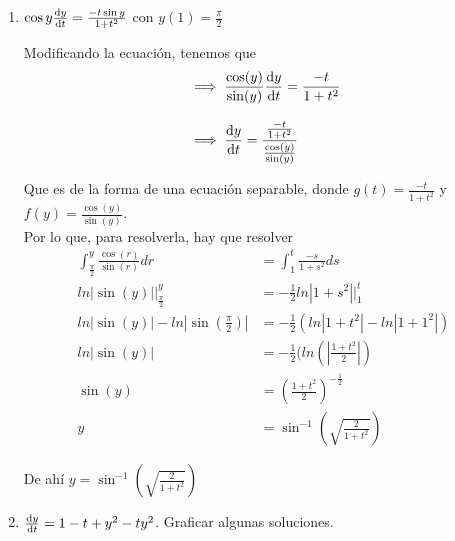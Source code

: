 \documentclass[14pt]{extarticle}
\begin{document}
\begin{enumerate}
{\begin{enumerate}
{                }

                \item {
                    $\cos{y}\dv{y}{t}=\frac{-t\sin{y}}{1+t^2}$
                    con $y(1)=\frac{\pi}{2}$

                    \color{azul}
                    Modificando la ecuación, tenemos que
                    \begin{align*}
                    &\implies \frac{\cos(y)}{\sin(y)}\dv{y}{t} = \frac{-t}{1 + t^2}\\[.3cm]
                    &\implies \dv{y}{t} = \frac{\frac{-t}{1 + t^2}}{ \frac{\cos(y)}{\sin(y)}}
                    \end{align*}
                    
                    Que es de la forma de una ecuación separable, donde $g(t) = \frac{-t}{1 + t^2}$ y $f(y) = \frac{\cos(y)}{\sin(y)}$.\\[.3cm]
                    
                    Por lo que, para resolverla, hay que resolver\\[.3cm]
                    
                    \begin{align*}
                    \int_{\frac{\pi}{2}}^{y} \frac{\cos(r)}{\sin(r)} dr &= \int_{1}^{t} \frac{-s}{1 + s^2} ds\\[.3cm]
                    ln|\sin(y)|\Big|_{\frac{\pi}{2}}^{y} &= -\frac{1}{2} ln|1 + s^2|\Big|_{1}^{t}\\[.3cm]
                    ln|\sin(y)| - ln|\sin(\frac{\pi}{2})| &= -\frac{1}{2} (ln|1 + t^2| - ln|1 + 1^2|)\\[.3cm]
                    ln|\sin(y)| &= -\frac{1}{2} (ln(|\frac{1 + t^2}{2}|)\\[.3cm]
                    \sin(y) &= (\frac{1 + t^2}{2})^{-\frac{1}{2}}\\[.3cm]
                    y &= \sin^{-1} (\sqrt{\frac{2}{1 + t^2}})
                    \end{align*}

                    De ahí $y = \sin^{-1} (\sqrt{\frac{2}{1 + t^2}})$\\[3.5cm]
                }

                \item {
                    $\dv{y}{t}=1-t+y^2-ty^2$.
                    Graficar algunas soluciones.

}
\end{enumerate}}
\end{enumerate}
\end{document}
